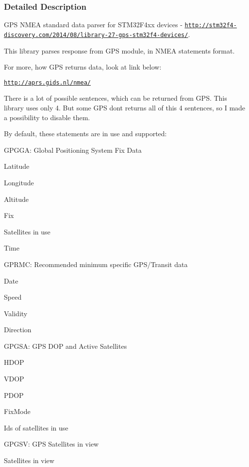 \subsubsection{Detailed Description}
G\+P\+S N\+M\+E\+A standard data parser for S\+T\+M32\+F4xx devices -\/ \href{http://stm32f4-discovery.com/2014/08/library-27-gps-stm32f4-devices/}{\tt http\+://stm32f4-\/discovery.\+com/2014/08/library-\/27-\/gps-\/stm32f4-\/devices/}. 

This library parses response from G\+P\+S module, in N\+M\+E\+A statements format.

For more, how G\+P\+S returns data, look at link below\+:

\href{http://aprs.gids.nl/nmea/}{\tt http\+://aprs.\+gids.\+nl/nmea/}

There is a lot of possible sentences, which can be returned from G\+P\+S. This library uses only 4. But some G\+P\+S don\textquotesingle{}t returns all of this 4 sentences, so I made a possibility to disable them.

By default, these statements are in use and supported\+:
\begin{DoxyItemize}
\item G\+P\+G\+G\+A\+: Global Positioning System Fix Data
\begin{DoxyItemize}
\item Latitude
\item Longitude
\item Altitude
\item Fix
\item Satellites in use
\item Time
\end{DoxyItemize}
\item G\+P\+R\+M\+C\+: Recommended minimum specific G\+P\+S/\+Transit data
\begin{DoxyItemize}
\item Date
\item Speed
\item Validity
\item Direction
\end{DoxyItemize}
\item G\+P\+G\+S\+A\+: G\+P\+S D\+O\+P and Active Satellites
\begin{DoxyItemize}
\item H\+D\+O\+P
\item V\+D\+O\+P
\item P\+D\+O\+P
\item Fix\+Mode
\item Id\textquotesingle{}s of satellites in use
\end{DoxyItemize}
\item G\+P\+G\+S\+V\+: G\+P\+S Satellites in view
\begin{DoxyItemize}
\item Satellites in view
\end{DoxyItemize}
\end{DoxyItemize}

